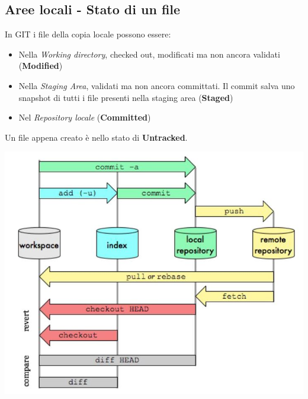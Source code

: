\documentclass[10pt, a4paper]{article}
\begin{document}
\subsection{Aree locali - Stato di un file}
\begin{minipage}{0.4\textwidth}
    In GIT i file della copia locale possono essere:
    \begin{itemize}
        \item Nella \textit{Working directory}, checked out, modificati ma non ancora validati (\textbf{Modified})
        \item Nella \textit{Staging Area}, validati ma non ancora committati. Il commit salva uno snapshot di tutti i file presenti nella staging area (\textbf{Staged})
        \item Nel \textit{Repository locale} (\textbf{Committed})
    \end{itemize}
    Un file appena creato è nello stato di \textbf{Untracked}.
\end{minipage}
\begin{minipage}{0.6\textwidth}
    \begin{center}
        \includegraphics[width=\textwidth]{img/git_command.jpg}
    \end{center}
\end{minipage}
\end{document}

